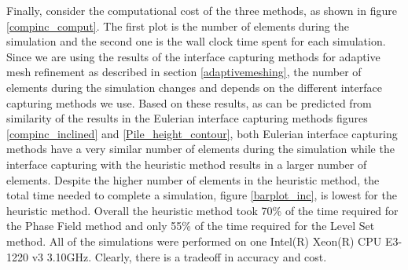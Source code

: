 \documentclass[review]{elsarticle}
\begin{document}
Finally, consider the computational cost of the three methods, as shown in figure \ref{compinc_comput}.
The first plot is the number of elements during the simulation and the second one is the wall clock time spent for each simulation.
Since we are using the results of the interface capturing methods for adaptive mesh refinement as described in section \ref{adaptivemeshing}, 
the number of elements during the simulation changes and depends on the different interface capturing methods we use. 
Based on these results, as can be predicted from similarity of the results in the Eulerian interface capturing methods figures \ref{compinc_inclined} 
and \ref{Pile_height_contour}, both Eulerian interface capturing methods have a very similar number of elements during the simulation while the 
interface capturing with the heuristic method results in a larger number of elements. 
Despite the higher number of elements in the heuristic method, the total time needed to complete a simulation, figure \ref{barplot_inc},
is lowest for the heuristic method. Overall the heuristic method took 70\% of the time required for the Phase Field method and only 55\% 
of the time required for the Level Set method.
All of the simulations were performed on one Intel(R) Xeon(R) CPU E3-1220 v3 3.10GHz. Clearly, there is a tradeoff in accuracy and cost.

\end{document}
